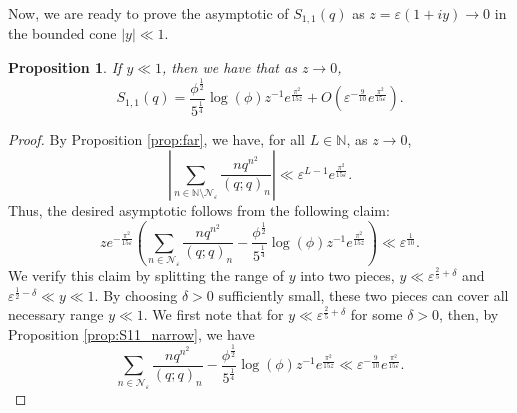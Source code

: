 \documentclass[11pt,reqno]{amsart}
\newtheorem{proposition}[theorem]{Proposition}
\theoremstyle{remark}
\numberwithin{equation}{section}
\begin{document}
Now, we are ready to prove the asymptotic of $S_{1,1}(q)$ as $z=\varepsilon(1+iy) \to 0$ in the bounded cone $|y|\ll 1$.
\begin{proposition}\label{prop:S11_asymp}
	If $y \ll 1$, then we have that as $z \to 0$,
	\[
		S_{1,1}(q) = \frac{\phi^{\frac12} }{5^{\frac14}}\log(\phi)  z^{-1} e^{\frac{\pi^2}{15 z}} +  O\left(\varepsilon^{-\frac{9}{10}} e^{\frac{\pi^2}{15\varepsilon}}\right).
	\]
\end{proposition}
\begin{proof}
By Proposition \ref{prop:far}, we have, for all $L \in \mathbb{N}$, as $z\to 0$,
\[
	\left|\sum_{n \in \mathbb{N} \setminus \mathcal{N}_{\varepsilon}}  \frac{nq^{n^2}}{(q;q)_n} \right| \ll \varepsilon^{L-1} e^{\frac{\pi^2}{15\varepsilon}}.
\]
Thus, the desired asymptotic follows from the following claim:
\[
	z e^{-\frac{\pi^2}{15\varepsilon}} \left(\sum_{n \in \mathcal{N}_{\varepsilon}} \frac{nq^{n^2}}{(q;q)_n} - \frac{\phi^{\frac12} }{5^{\frac14}}\log(\phi)  z^{-1} e^{\frac{\pi^2}{15 z}} \right) \ll \varepsilon^{\frac{1}{10}} .
\]
We verify this claim by splitting the range of $y$ into two pieces, $y \ll \varepsilon^{\frac25+\delta}$ and  $\varepsilon^{\frac12-\delta}\ll y \ll 1$. By choosing $\delta >0$ sufficiently small, these two pieces can cover all necessary range $y \ll 1$. We first note that for $y \ll \varepsilon^{\frac25+\delta}$ for some $\delta>0$, then, by Proposition \ref{prop:S11_narrow}, we have
\[
	\sum_{n \in \mathcal{N}_{\varepsilon}} \frac{nq^{n^2}}{(q;q)_n} - \frac{\phi^{\frac12} }{5^{\frac14}}\log(\phi)  z^{-1} e^{\frac{\pi^2}{15 z}} \ll \varepsilon^{-\frac{9}{10}} e^{\frac{\pi^2}{15\varepsilon}}.
\]


\end{proof}
\end{document}
